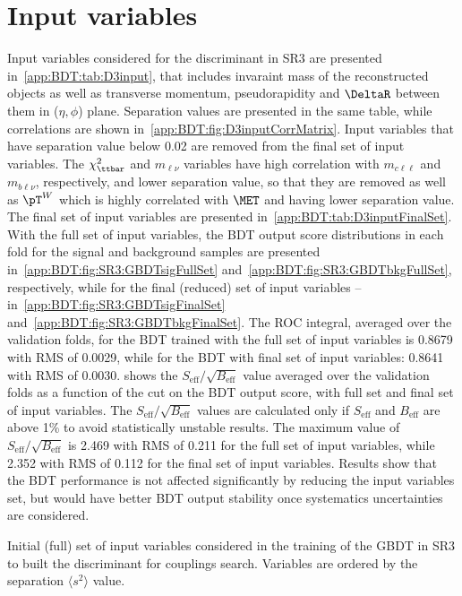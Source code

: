 \section{Input variables}
\indent Input variables considered for the \Dthree discriminant in SR3 are presented in~\cref{app:BDT:tab:D3input}, that includes invaraint mass of the reconstructed objects
as well as transverse momentum, pseudorapidity and $\DeltaR$ between them in ($\eta,\phi$) plane. Separation values are presented in the same table,
while correlations are shown in~\cref{app:BDT:fig:D3inputCorrMatrix}.
Input variables that have separation value below 0.02 are removed from the final set of input variables.
The $\chi^{2}_{\ttbar}$ and $m_{\ell\nu}$ variables have high correlation with $m_{c\ell\ell}$ and $m_{b\ell\nu}$, respectively, and lower separation value, so that they are removed
as well as $\pT^{W}$ which is highly correlated with $\MET$ and having lower separation value.
The final set of input variables are presented in~\cref{app:BDT:tab:D3inputFinalSet}.
With the full set of input variables, the BDT output score distributions in each fold for the signal and background samples are presented in~\cref{app:BDT:fig:SR3:GBDTsigFullSet}
and~\cref{app:BDT:fig:SR3:GBDTbkgFullSet}, respectively, while for the final (reduced) set of input variables -- in~\cref{app:BDT:fig:SR3:GBDTsigFinalSet}
and~\cref{app:BDT:fig:SR3:GBDTbkgFinalSet}.
The ROC integral, averaged over the validation folds, for the BDT trained with the full set of input variables is 0.8679 with RMS of 0.0029,
while for the BDT with final set of input variables: 0.8641 with RMS of 0.0030.
 shows the $S_{\text{eff}}/\sqrt{B_{\text{eff}}}$ value averaged over the validation folds
as a function of the cut on the BDT output score, with full set and final set of input variables.
The $S_{\text{eff}}/\sqrt{B_{\text{eff}}}$ values are calculated only if $S_{\text{eff}}$ and $B_{\text{eff}}$ are above 1\% to avoid statistically unstable results.
The maximum value of $S_{\text{eff}}/\sqrt{B_{\text{eff}}}$ is 2.469 with RMS of 0.211 for the full set of input variables,
while 2.352 with RMS of 0.112 for the final set of input variables.
Results show that the BDT performance is not affected significantly by reducing the input variables set, 
but would have better BDT output stability once systematics uncertainties are considered.

\begin{table}[!htbp]
	\scriptsize
	\caption{
		Initial (full) set of input variables considered in the training of the GBDT in SR3 to built the \Dthree discriminant for \tZc couplings search.
		Variables are ordered by the separation $\langle s^{2}\rangle$ value.
	}%
	\label{app:BDT:tab:D3input}
	
	\centering
\end{table}


